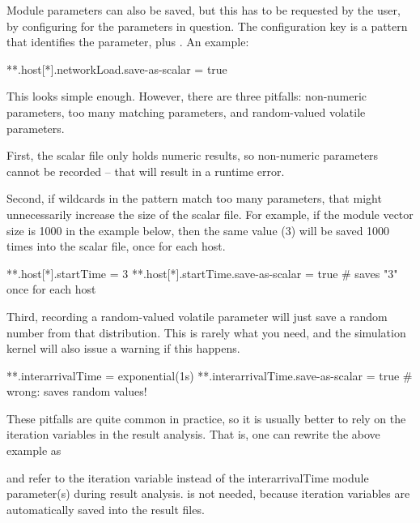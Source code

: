 Module parameters can also be saved, but this has to be
requested by the user, by configuring  for the
parameters in question. The configuration key is a pattern that
identifies the parameter, plus . An example:

\begin{inifile}
**.host[*].networkLoad.save-as-scalar = true
\end{inifile}

This looks simple enough. However, there are three pitfalls:
non-numeric parameters, too many matching parameters, and
random-valued volatile parameters.

First, the scalar file only holds numeric results, so non-numeric
parameters cannot be recorded -- that will result in a runtime
error.

Second, if wildcards in the pattern match too many parameters, that
might unnecessarily increase the size of the scalar file. For example,
if the  module vector size is 1000 in the example below, then the
same value (3) will be saved 1000 times into the scalar file, once for
each host.

\begin{inifile}
**.host[*].startTime = 3
**.host[*].startTime.save-as-scalar = true  # saves "3" once for each host
\end{inifile}

Third, recording a random-valued volatile parameter will just save a
random number from that distribution. This is rarely what you need, and
the simulation kernel will also issue a warning if this happens.

\begin{inifile}
**.interarrivalTime = exponential(1s)
**.interarrivalTime.save-as-scalar = true  # wrong: saves random values!
\end{inifile}

These pitfalls are quite common in practice, so it is usually better
to rely on the iteration variables in the result analysis.
That is, one can rewrite the above example as


and refer to the  iteration variable instead of the
interarrivalTime module parameter(s) during result analysis.
 is not needed, because iteration variables are
automatically saved into the result files.


